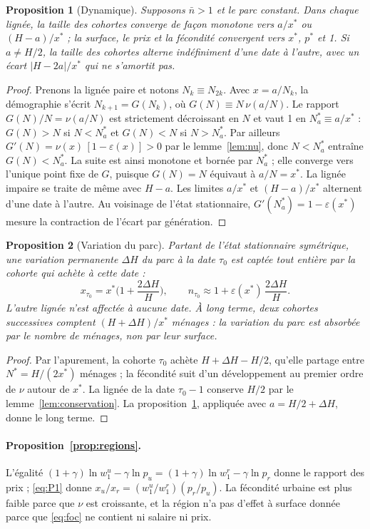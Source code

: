 \documentclass[11pt,a4paper]{article}
\theoremstyle{plain}
\newtheorem{proposition}{Proposition}
\theoremstyle{definition}
\theoremstyle{remark}
\newcommand{\eps}{\varepsilon}
\begin{document}
\begin{proposition}[Dynamique]\label{prop:stab}
Supposons $\bar n > 1$ et le parc constant. Dans chaque lignée, la taille des cohortes converge de façon monotone vers $a/x^*$ ou $(H-a)/x^*$ ; la surface, le prix et la fécondité convergent vers $x^*$, $p^*$ et 1. Si $a \neq H/2$, la taille des cohortes alterne indéfiniment d'une date à l'autre, avec un écart $|H-2a|/x^*$ qui ne s'amortit pas.
\end{proposition}
\begin{proof}
Prenons la lignée paire et notons $N_k \equiv N_{2k}$. Avec $x = a/N_k$, la démographie s'écrit $N_{k+1} = G(N_k)$, où $G(N) \equiv N\,\nu(a/N)$. Le rapport $G(N)/N = \nu(a/N)$ est strictement décroissant en $N$ et vaut 1 en $N_a^* \equiv a/x^*$ : $G(N) > N$ si $N < N_a^*$ et $G(N) < N$ si $N > N_a^*$. Par ailleurs $G'(N) = \nu(x)\,[1-\eps(x)] > 0$ par le lemme~\ref{lem:nu}, donc $N < N_a^*$ entraîne $G(N) < N_a^*$. La suite est ainsi monotone et bornée par $N_a^*$ ; elle converge vers l'unique point fixe de $G$, puisque $G(N) = N$ équivaut à $a/N = x^*$. La lignée impaire se traite de même avec $H-a$. Les limites $a/x^*$ et $(H-a)/x^*$ alternent d'une date à l'autre. Au voisinage de l'état stationnaire, $G'(N_a^*) = 1 - \eps(x^*)$ mesure la contraction de l'écart par génération.
\end{proof}

\begin{proposition}[Variation du parc]\label{prop:choc}
Partant de l'état stationnaire symétrique, une variation permanente $\Delta H$ du parc à la date $\tau_0$ est captée tout entière par la cohorte qui achète à cette date :
\[
x_{\tau_0} = x^*\Big(1 + \frac{2\Delta H}{H}\Big), \qquad n_{\tau_0} \approx 1 + \eps(x^*)\,\frac{2\Delta H}{H}.
\]
L'autre lignée n'est affectée à aucune date. À long terme, deux cohortes successives comptent $(H+\Delta H)/x^*$ ménages : la variation du parc est absorbée par le nombre de ménages, non par leur surface.
\end{proposition}
\begin{proof}
Par l'apurement, la cohorte $\tau_0$ achète $H + \Delta H - H/2$, qu'elle partage entre $N^* = H/(2x^*)$ ménages ; la fécondité suit d'un développement au premier ordre de $\nu$ autour de $x^*$. La lignée de la date $\tau_0 - 1$ conserve $H/2$ par le lemme~\ref{lem:conservation}. La proposition~\ref{prop:stab}, appliquée avec $a = H/2 + \Delta H$, donne le long terme.
\end{proof}

\paragraph{Proposition~\ref{prop:regions}.} L'égalité $(1+\gamma)\ln w_1^u - \gamma\ln p_u = (1+\gamma)\ln w_1^r - \gamma\ln p_r$ donne le rapport des prix ; \eqref{eq:P1} donne $x_u/x_r = (w_1^u/w_1^r)(p_r/p_u)$. La fécondité urbaine est plus faible parce que $\nu$ est croissante, et la région n'a pas d'effet à surface donnée parce que \eqref{eq:foc} ne contient ni salaire ni prix.
\end{document}
